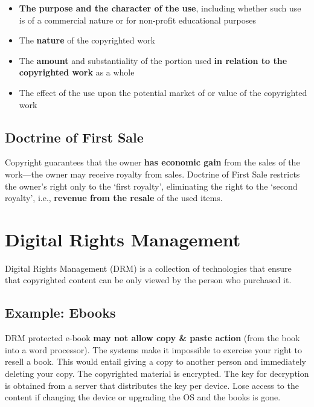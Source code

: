 \documentclass{article}
\begin{document}
\begin{itemize}
  \item \textbf{The purpose and the character of the use}, including whether such use is of a commercial nature or for non-profit educational purposes
  \item The \textbf{nature} of the copyrighted work
  \item The \textbf{amount} and substantiality of the portion used \textbf{in relation to the copyrighted work} as a whole
  \item The effect of the use upon the potential market of or value of the copyrighted work
\end{itemize}

\subsection{Doctrine of First Sale}

\begin{flushleft}
Copyright guarantees that the owner \textbf{has economic gain} from the sales of the work—the owner may receive royalty from sales. Doctrine of First Sale restricts the owner’s right only to the ‘first royalty’, eliminating the right to the ‘second royalty’, i.e., \textbf{revenue from the resale} of the used items.
\end{flushleft}

\section{Digital Rights Management}

\begin{flushleft}
Digital Rights Management (DRM) is a collection of technologies that ensure that copyrighted content can be only viewed by the person who purchased it.
\end{flushleft}

\subsection{Example: Ebooks}
\begin{flushleft}
DRM protected e-book \textbf{may not allow copy \& paste action} (from the book into a word processor). The systems make it impossible to exercise your right to resell a book. This would entail giving a copy to another person and immediately deleting your copy. The copyrighted material is encrypted. The key for decryption is obtained from a server that distributes the key per device. Lose access to the content if changing the device or upgrading the OS and the books is gone.
\end{flushleft}
\end{document}
